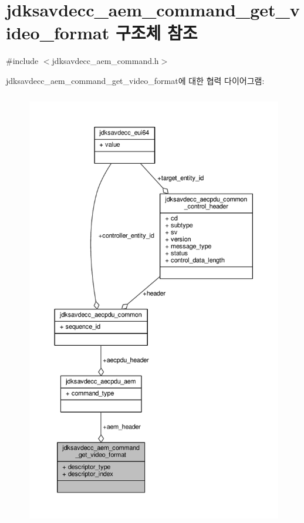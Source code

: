 \hypertarget{structjdksavdecc__aem__command__get__video__format}{}\section{jdksavdecc\+\_\+aem\+\_\+command\+\_\+get\+\_\+video\+\_\+format 구조체 참조}
\label{structjdksavdecc__aem__command__get__video__format}


{\ttfamily \#include $<$jdksavdecc\+\_\+aem\+\_\+command.\+h$>$}



jdksavdecc\+\_\+aem\+\_\+command\+\_\+get\+\_\+video\+\_\+format에 대한 협력 다이어그램\+:
\nopagebreak
\begin{figure}[H]
\begin{center}
\leavevmode
\includegraphics[height=550pt]{structjdksavdecc__aem__command__get__video__format__coll__graph}
\end{center}
\end{figure}
